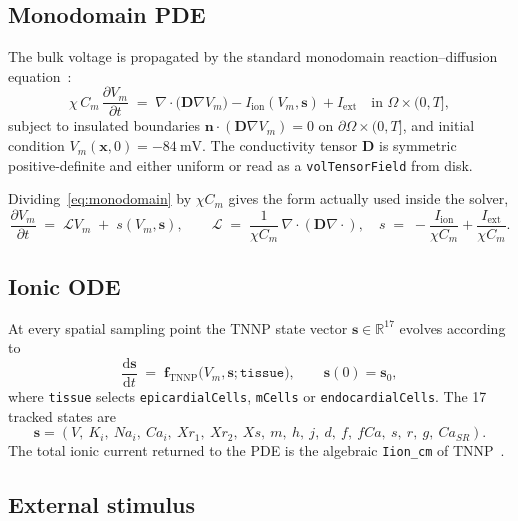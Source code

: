 \documentclass[11pt,a4paper]{article}
\newcommand{\Vm}{V_{m}}
\newcommand{\Iion}{I_{\text{ion}}}
\newcommand{\Iext}{I_{\text{ext}}}
\newcommand{\Dten}{\mathbf{D}}
\newcommand{\grad}{\nabla}
\newcommand{\divg}{\nabla\!\cdot}
\newcommand{\code}[1]{\texttt{\small #1}}
\begin{document}
\subsection{Monodomain PDE}

The bulk voltage is propagated by the standard monodomain
reaction--diffusion equation~\cite{ttp2004,niederer2012}:
\begin{equation}
  \chi \, C_{m} \, \frac{\partial \Vm}{\partial t}
   \;=\;
   \divg\!\bigl( \Dten \grad \Vm \bigr)
   - \Iion(\Vm, \mathbf{s})
   + \Iext
   \quad \text{in } \Omega \times (0, T],
   \label{eq:monodomain}
\end{equation}
subject to insulated boundaries
$\mathbf{n} \cdot ( \Dten \grad \Vm ) = 0$ on
$\partial \Omega \times (0, T]$, and initial condition
$\Vm(\mathbf{x}, 0) = -\SI{84}{\milli\volt}$. The conductivity tensor
$\Dten$ is symmetric positive-definite and either uniform or read as a
\code{volTensorField} from disk.

Dividing~\eqref{eq:monodomain} by $\chi C_{m}$ gives the form actually
used inside the solver,
\begin{equation}
  \frac{\partial \Vm}{\partial t}
   \;=\;
   \mathcal{L} \Vm
   \;+\;
   s(\Vm, \mathbf{s}),
   \qquad
   \mathcal{L} \;=\; \frac{1}{\chi C_{m}}\,\divg(\Dten \grad \cdot),
   \quad
   s \;=\; -\frac{\Iion}{\chi C_{m}} + \frac{\Iext}{\chi C_{m}}.
   \label{eq:semi-discrete}
\end{equation}

\subsection{Ionic ODE}

At every spatial sampling point the TNNP state vector
$\mathbf{s} \in \mathbb{R}^{17}$ evolves according to
\begin{equation}
  \frac{\mathrm{d}\mathbf{s}}{\mathrm{d}t}
   \;=\;
   \mathbf{f}_{\text{TNNP}}\!\bigl(\Vm, \mathbf{s}; \texttt{tissue}\bigr),
   \qquad \mathbf{s}(0) = \mathbf{s}_{0},
   \label{eq:tnnp}
\end{equation}
where \code{tissue} selects \code{epicardialCells}, \code{mCells} or
\code{endocardialCells}. The 17 tracked states are
\[
  \mathbf{s} = (V,\ K_{i},\ Na_{i},\ Ca_{i},\ Xr_{1},\ Xr_{2},\ Xs,\ m,\ h,\ j,\ d,\ f,\ fCa,\ s,\ r,\ g,\ Ca_{SR}).
\]
The total ionic current returned to the PDE is the algebraic
\code{Iion\_cm} of TNNP~\cite{ttp2004}.

\subsection{External stimulus}
\end{document}
